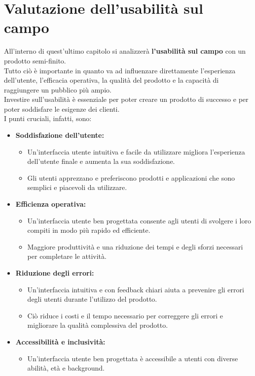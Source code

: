 \documentclass{article}
\begin{document}
		\newpage
	\section{Valutazione dell'usabilità sul campo}
	All'interno di quest'ultimo capitolo si analizzerà \textbf{l'usabilità sul campo} con un prodotto semi-finito.\\
	Tutto ciò è importante in quanto va ad influenzare direttamente l'esperienza dell'utente, l'efficacia operativa, la qualità del prodotto e la capacità di raggiungere un pubblico più ampio.\\
	Investire sull'usabilità è essenziale per poter creare un prodotto di successo e per poter soddisfare le esigenze dei clienti.\\
	I punti cruciali, infatti, sono:
	\begin{itemize}
		\item \textbf{Soddisfazione dell'utente:}
		\begin{itemize}
			\item Un'interfaccia utente intuitiva e facile da utilizzare migliora l'esperienza dell'utente finale e aumenta la sua soddisfazione.
			\item Gli utenti apprezzano e preferiscono prodotti e applicazioni che sono semplici e piacevoli da utilizzare.
		\end{itemize}
		\item \textbf{Efficienza operativa:}
		\begin{itemize}
			\item Un'interfaccia utente ben progettata consente agli utenti di svolgere i loro compiti in modo più rapido ed efficiente.
			\item Maggiore produttività e una riduzione dei tempi e degli sforzi necessari per completare le attività.
		\end{itemize}
		\item \textbf{Riduzione degli errori:}
		\begin{itemize}
			\item Un'interfaccia intuitiva e con feedback chiari aiuta a prevenire gli errori degli utenti durante l'utilizzo del prodotto.
			\item Ciò riduce i costi e il tempo necessario per correggere gli errori e migliorare la qualità complessiva del prodotto.
		\end{itemize}
		\item \textbf{Accessibilità e inclusività:}
		\begin{itemize}
			\item Un'interfaccia utente ben progettata è accessibile a utenti con diverse abilità, età e background.

\end{itemize}
\end{itemize}
\end{document}
